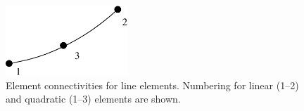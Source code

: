 \documentclass[11pt]{article}
\begin{document}
%
%
%
%
%
%
%
%
%
%
%
%
%
\begin{figure}[h!p]
\centering
     \includegraphics[width=1.8in]{figs/line3.xfig.eps}
     \caption{Element connectivities for line
     elements. Numbering for linear (1--2) and quadratic (1--3) elements are
     shown.}
\end{figure}
\end{document}
